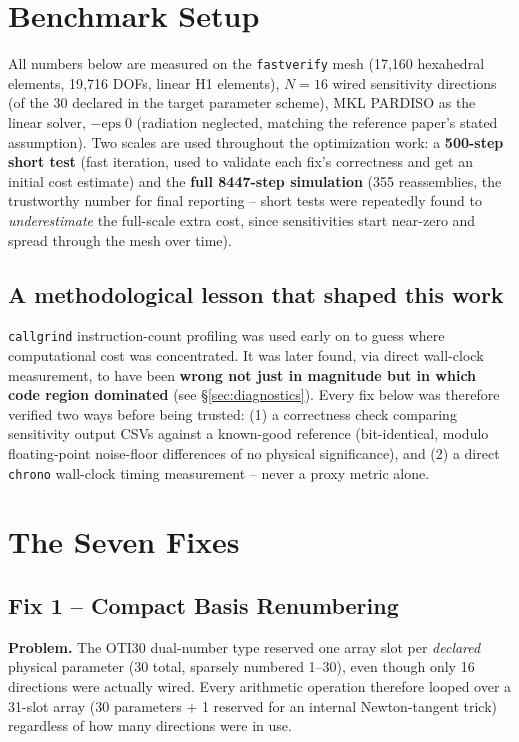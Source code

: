 \documentclass[11pt]{article}
\begin{document}
\section{Benchmark Setup}

All numbers below are measured on the \texttt{fastverify} mesh (17{,}160
hexahedral elements, 19{,}716 DOFs, linear H1 elements), $N=16$ wired
sensitivity directions (of the 30 declared in the target parameter
scheme), MKL PARDISO as the linear solver, $-\text{eps}\;0$ (radiation
neglected, matching the reference paper's stated assumption). Two scales
are used throughout the optimization work: a \textbf{500-step short test}
(fast iteration, used to validate each fix's correctness and get an
initial cost estimate) and the \textbf{full 8447-step simulation}
(355 reassemblies, the trustworthy number for final reporting -- short
tests were repeatedly found to \emph{underestimate} the full-scale extra
cost, since sensitivities start near-zero and spread through the mesh
over time).

\subsection*{A methodological lesson that shaped this work}
\texttt{callgrind} instruction-count profiling was used early on to guess
where computational cost was concentrated. It was later found, via direct
wall-clock measurement, to have been \textbf{wrong not just in magnitude
but in which code region dominated} (see \S\ref{sec:diagnostics}). Every
fix below was therefore verified two ways before being trusted: (1) a
correctness check comparing sensitivity output CSVs against a known-good
reference (bit-identical, modulo floating-point noise-floor differences
of no physical significance), and (2) a direct \texttt{chrono} wall-clock
timing measurement -- never a proxy metric alone.

\section{The Seven Fixes}

\subsection{Fix 1 -- Compact Basis Renumbering}
\textbf{Problem.} The OTI30 dual-number type reserved one array slot per
\emph{declared} physical parameter (30 total, sparsely numbered 1--30),
even though only 16 directions were actually wired. Every arithmetic
operation therefore looped over a 31-slot array (30 parameters + 1
reserved for an internal Newton-tangent trick) regardless of how many
directions were in use.
\end{document}
